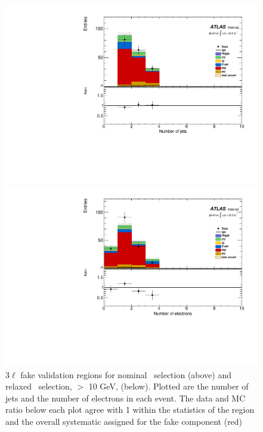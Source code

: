 \begin{figure}[!htbp]
\begin{minipage}[h]{0.5\textwidth}
    \centering \includegraphics[width=\textwidth]{figs/fake/plotCand_3lep_LowNJet_NJet}
  \end{minipage}\hfill
  \begin{minipage}[h]{0.5\textwidth}
    \centering \includegraphics[width=\textwidth]{figs/fake/plotCand_3lep_LowNJet_NElec}
  \end{minipage}\hfill
  \caption{ 3$\ell$ fake validation regions for nominal \pt\ selection (above) and relaxed \pt\ selection, $>$ 10 GeV, (below). Plotted are the number of jets and the number of electrons in each event. The data and MC ratio below each plot agree with 1 within the statistics of the region and the overall systematic assigned for the fake component (red)}  
  \label{figure:background_3lvaldiation}
\end{figure} 




